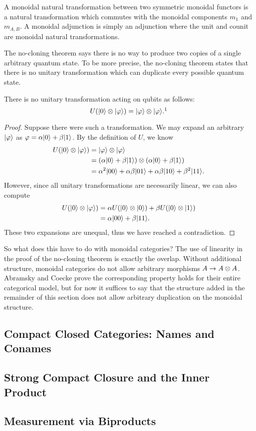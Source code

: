 A monoidal natural transformation between two symmetric monoidal functors
is a natural transformation which commutes with the monoidal components $m_1$ and $m_{A,B}$.
A monoidal adjunction is simply an adjunction where the unit and counit
are monoidal natural transformations.

The no-cloning theorem says there is no way to produce two copies of a single 
arbitrary quantum state. To be more precise, the no-cloning theorem states that
there is no unitary transformation which can duplicate every possible quantum state.

\begin{theorem}
    There is no unitary transformation acting on qubits as follows:
    \[ U(\ket{0}\tensor\ket{\varphi}) = \ket{\varphi}\tensor\ket{\varphi}.\footnotemark \]
\end{theorem}
\begin{proof}
    Suppose there were such a transformation. We may expand an arbitrary ${\left\vert{\varphi}\right\rangle}$
    as $\varphi = \alpha{\left\vert{0}\right\rangle} + \beta{\left\vert{1}\right\rangle}$. By the definition of $U$, we know
    \begin{align*} 
        U({\left\vert{0}\right\rangle} \otimes {\left\vert{\varphi}\right\rangle})
        &= {\left\vert{\varphi}\right\rangle} \otimes {\left\vert{\varphi}\right\rangle} \\
        &= (\alpha{\left\vert{0}\right\rangle} + \beta{\left\vert{1}\right\rangle}) \otimes (\alpha{\left\vert{0}\right\rangle} + \beta{\left\vert{1}\right\rangle}) \\
        &= \alpha^2 {\left\vert{00}\right\rangle} + \alpha\beta{\left\vert{01}\right\rangle} + \alpha\beta{\left\vert{10}\right\rangle} + \beta^2{\left\vert{11}\right\rangle}.
    \end{align*}
    However, since all unitary transformations are necessarily linear, we can also compute
    \begin{align*}
        U({\left\vert{0}\right\rangle} \otimes {\left\vert{\varphi}\right\rangle})
        &= \alpha U({\left\vert{0}\right\rangle} \otimes {\left\vert{0}\right\rangle}) + \beta U({\left\vert{0}\right\rangle} \otimes {\left\vert{1}\right\rangle}) \\
        &= \alpha {\left\vert{00}\right\rangle} + \beta {\left\vert{11}\right\rangle}.
    \end{align*}
    These two expansions are unequal, thus we have reached a contradiction. 
\end{proof}

So what does this have to do with monoidal categories? 
The use of linearity in the proof of the no-cloning theorem is exactly the overlap.
Without additional structure, monoidal categories do not allow arbitrary
morphisms $A \rightarrow A \otimes A$. Abramsky and Coecke\cite{abramsky2009categorical}
prove the corresponding property holds for their entire categorical model,
but for now it suffices to say that the structure added in the remainder
of this section does not allow arbitrary duplication on the monoidal structure.

\subsection{Compact Closed Categories: Names and Conames}

\subsection{Strong Compact Closure and the Inner Product}

\subsection{Measurement via Biproducts}
